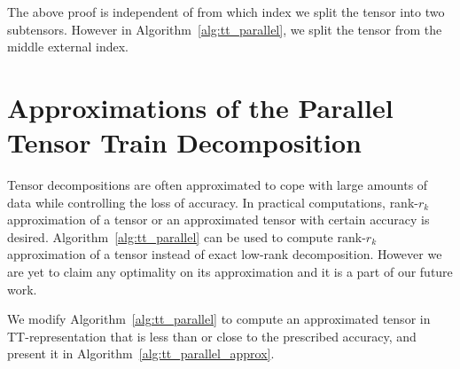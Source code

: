 \documentclass[runningheads]{llncs}
\begin{document}
\indent The above proof is independent of from which index we split the tensor into two subtensors. However in Algorithm~\ref{alg:tt_parallel}, we split the tensor from the middle external index.


\section{Approximations of the Parallel Tensor Train Decomposition}
\label{sec:approaches}
Tensor decompositions are often approximated to cope with large amounts of data while controlling the loss of accuracy. In practical computations, rank-$r_k$ approximation of a tensor or an approximated tensor with certain accuracy is desired. Algorithm~\ref{alg:tt_parallel} can be used to compute rank-$r_k$ approximation of a tensor instead of exact low-rank decomposition. However we are yet to claim any optimality on its approximation and it is a part of our future work.

We modify Algorithm~\ref{alg:tt_parallel} to compute an approximated tensor in TT-representation that is less than or close to the prescribed accuracy, and present it in Algorithm~\ref{alg:tt_parallel_approx}.
\end{document}
